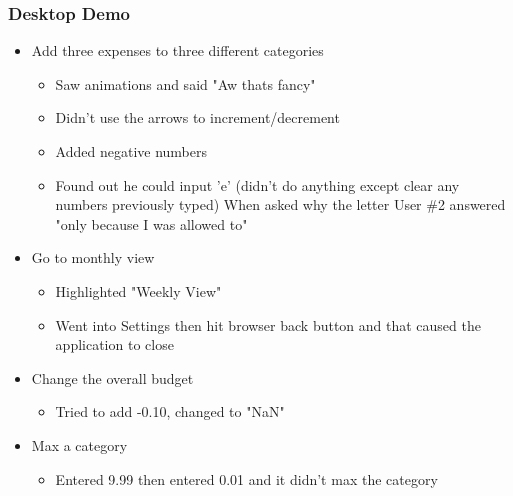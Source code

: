 \documentclass{chi2011}
\begin{document}
	\subsubsection{Desktop Demo}
	\begin{itemize}[noitemsep] 
		\item Add three expenses to three different categories
		\begin{itemize}[noitemsep]
			\item Saw animations and said "Aw thats fancy"
			\item Didn't use the arrows to increment/decrement
			\item Added negative numbers
			\item Found out he could input 'e' (didn't do anything except clear any numbers previously 
			typed) When asked why the letter User \#2 answered "only because I was allowed to"
		\end{itemize}
		\item Go to monthly view
		\begin{itemize}[noitemsep]
			\item Highlighted "Weekly View"
			\item Went into Settings then hit browser back button and that caused the application to close
		\end{itemize}
		\item Change the overall budget
		\begin{itemize}[noitemsep]
			\item Tried to add -0.10, changed to "NaN"
		\end{itemize}
		\item Max a category
		\begin{itemize}[noitemsep]
			\item Entered 9.99 then entered 0.01 and it didn't max the category
		\end{itemize}
	\end{itemize}
	
\end{document}
